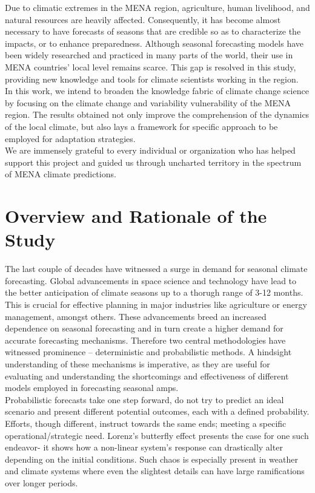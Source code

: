 Due to climatic extremes in the MENA region, agriculture, human livelihood, and natural resources are heavily affected. Consequently, it has become almost necessary to have forecasts of seasons that are credible so as to characterize the impacts, or to enhance preparedness. Although seasonal forecasting models have been widely researched and practiced in many parts of the world, their use in MENA countries’ local level remains scarce. This gap is resolved in this study, providing new knowledge and tools for climate scientists working in the region.\\

In this work, we intend to broaden the knowledge fabric of climate change science by focusing on the climate change and variability vulnerability of the MENA region. The results obtained not only improve the comprehension of the dynamics of the local climate, but also lays a framework for specific approach to be employed for adaptation strategies.\\

We are immensely grateful to every individual or organization who has helped support this project and guided us through uncharted territory in the spectrum of MENA climate predictions.\\
\newpage
\section*{Overview and Rationale of the Study}
The last couple of decades have witnessed a surge in demand for seasonal climate forecasting. Global advancements in space science and technology have lead to the better anticipation of climate seasons up to a thorugh range of 3-12 months. This is crucial for effective planning in major industries like agriculture or energy management, amongst others. These advancements breed an increased dependence on seasonal forecasting and in turn create a higher demand for accurate forecasting mechanisms. Therefore two central methodologies have witnessed prominence – deterministic and probabilistic methods. A hindsight understanding of these mechanisms is imperative, as they are useful for evaluating and understanding the shortcomings and effectiveness of different models employed in forecasting seasonal amps.\\

Probabilistic forecasts take one step forward, do not try to predict an ideal scenario and present different potential outcomes, each with a defined probability. Efforts, though different, instruct towards the same ends; meeting a specific operational/strategic need. Lorenz’s butterfly effect presents the case for one such endeavor- it shows how a non-linear system’s response can drastically alter depending on the initial conditions. Such chaos is especially present in weather and climate systems where even the slightest details can have large ramifications over longer periods.\\

